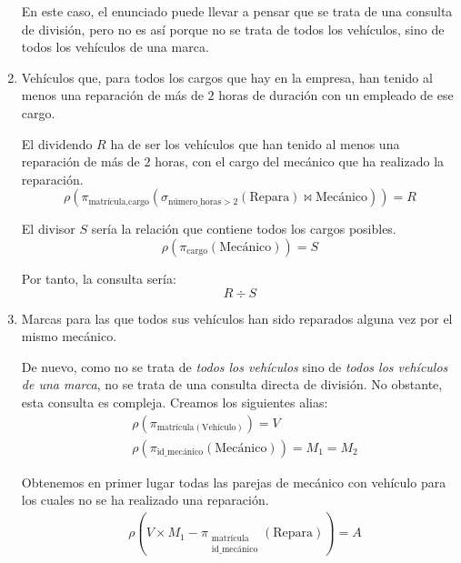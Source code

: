 \begin{ejercicio}
\begin{enumerate}
        \begin{observacion}
            En este caso, el enunciado puede llevar a pensar que se trata de una consulta de división, pero no es así porque no se trata de todos los vehículos, sino de todos los vehículos de una marca.
        \end{observacion}

        \item Vehículos que, para todos los cargos que hay en la empresa, han tenido al menos una reparación de más de $2$ horas de duración con un empleado de ese cargo.
        
        El dividendo $R$ ha de ser los vehículos que han tenido al menos una reparación de más de $2$ horas, con el cargo del mecánico que ha realizado la reparación.
        \begin{equation*}
            \rho\left(\pi_{\text{matrícula},\text{cargo}}(\sigma_{\text{número\_horas} > 2}(\text{Repara})\bowtie \text{Mecánico})\right) = R
        \end{equation*}

        El divisor $S$ sería la relación que contiene todos los cargos posibles.
        \begin{equation*}
            \rho(\pi_{\text{cargo}}(\text{Mecánico})) = S
        \end{equation*}

        Por tanto, la consulta sería:
        \begin{equation*}
            R \div S
        \end{equation*}

        \item Marcas para las que todos sus vehículos han sido reparados alguna vez por el mismo mecánico.
        
        De nuevo, como no se trata de \emph{todos los vehículos} sino de \emph{todos los vehículos de una marca}, no se trata de una consulta directa de división. No obstante, esta consulta es compleja. Creamos los siguientes alias:
        \begin{align*}
            & \rho(\pi_{\text{matrícula}(\text{Vehículo})})=V\\
            & \rho(\pi_{\text{id\_mecánico}}(\text{Mecánico}))=M_1=M_2
        \end{align*}

        Obtenemos en primer lugar todas las parejas de mecánico con vehículo para los cuales no se ha realizado una reparación.
        \begin{align*}
            &\rho\left(V\times M_1 - \pi_{\substack{\text{matrícula}\\\text{id\_mecánico}}}(\text{Repara})\right)=A
        \end{align*}


\end{enumerate}
\end{ejercicio}
